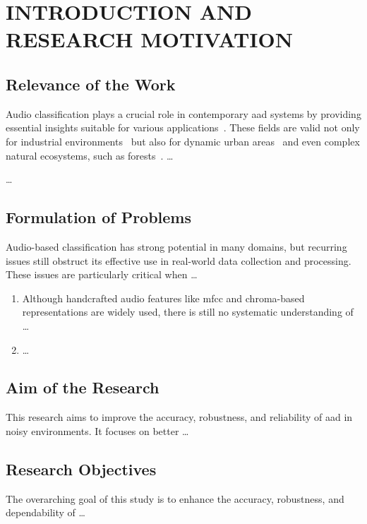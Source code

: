 \section*{\MakeUppercase{Introduction and Research Motivation}}\label{chap:intro}
\glsresetall
{}
\subsection*{Relevance of the Work}\label{subsec:relevance}
Audio classification plays a crucial role in contemporary \gls{aad} systems by providing {essential insights}\label{rev:ru_min_1a} suitable for various applications~\cite{Kilickaya2025, LoScudo2023, Barusco2025}. These fields are valid not only for industrial environments~\cite{Purohit2019} but also for dynamic urban areas~\cite{Piczak2015, Salamon2014} and even complex natural ecosystems, such as forests~\cite{Bandara2023}. \dots

\dots

\subsection*{Formulation of Problems}\label{sec:form_prob}
Audio-based classification has strong potential in many domains, but recurring issues still obstruct its effective use in real-world data collection and processing. These issues are particularly critical when \dots

\begin{enumerate}[leftmargin=*]
	\item Although handcrafted audio features like \gls{mfcc} and chroma-based representations are widely used, there is still no systematic understanding of \dots
	\item \dots
\end{enumerate}

\subsection*{Aim of the Research}\label{sec:aim}
{This research aims to improve the accuracy, robustness, and reliability of \gls{aad} in noisy environments. It focuses on better \dots}

\subsection*{Research Objectives}\label{sec:r_o}
The overarching goal of this study is to enhance the accuracy, robustness, and dependability of \dots

